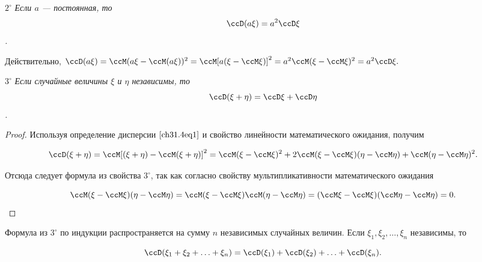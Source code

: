 $2^{\circ}$ \textit{Если $a$ --- постоянная, то $$\ccD(a\xi) = a^2 \ccD\xi$$.}

Действительно, $\ccD(a\xi) = \ccM(a\xi - \ccM (a\xi))^2 = \ccM [a (\xi - \ccM \xi)]^2 = a^2\ccM(\xi - \ccM\xi)^2 = a^2 \ccD\xi.$

$3^{\circ}$ \textit{Если случайные величины $\xi$ и $\eta$ независимы, то $$\ccD(\xi + \eta) = \ccD\xi + \ccD\eta$$.}

\begin{proof}
Используя определение дисперсии $\eqref{ch31.4eq1}$ и свойство линейности математического ожидания, получим

$$
\ccD(\xi + \eta) = \ccM[(\xi + \eta) - \ccM(\xi + \eta)]^2 = \ccM(\xi - \ccM\xi)^2 + 2\ccM(\xi - \ccM\xi)(\eta - \ccM\eta) + \ccM(\eta  - \ccM\eta)^2.
$$

Отсюда следует формула из свойства $3^{\circ}$, так как согласно свойству мультипликативности математического ожидания

$$
\ccM(\xi - \ccM\xi)(\eta - \ccM\eta) = \ccM(\xi - \ccM\xi)\ccM(\eta - \ccM\eta) = (\ccM\xi - \ccM\xi)(\ccM\eta - \ccM\eta) = 0.
$$


\end{proof}

Формула из $3^{\circ}$ по индукции распространяется на сумму $n$ независимых случайных величин. Если $\xi_1,\xi_2, \ldots, \xi_n$ независимы, то 

$$
\ccD(\xi_1 + \xi_2 + \ldots + \xi_n) = \ccD(\xi_1) + \ccD(\xi_2) + \ldots + \ccD(\xi_n).
$$